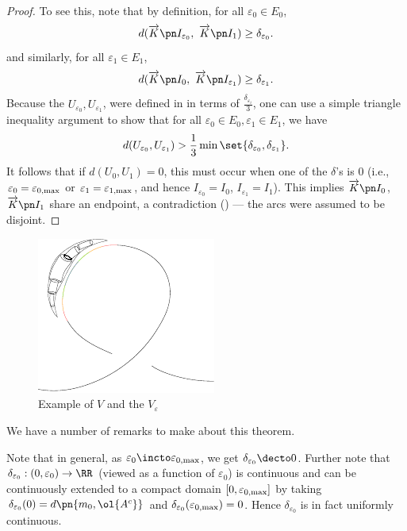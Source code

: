 \begin{proof}
  To see this, note that by definition, for all $\varepsilon_0 \in
  E_0$,
  \[
    d(\fim{K}{I_{\varepsilon_0}},\ \fim{K}{I_1}) \geq
    \delta_{\varepsilon_0}.
  \]
  and similarly, for all $\varepsilon_1 \in E_1$,
  \[
    d(\fim{K}{I_{0}},\ \fim{K}{I_{\varepsilon_1}}) \geq
    \delta_{\varepsilon_1}.
  \]
  Because the $U_{\varepsilon_0}, U_{\varepsilon_1}$, were defined in
  in terms of $\frac{\delta_{\varepsilon_i}}{3}$, one can use a simple
  triangle inequality argument to show that for all $\varepsilon_0 \in
  E_0, \varepsilon_1 \in E_1$, we have
  \[
    d(U_{\varepsilon_0}, U_{\varepsilon_1}) > \frac{1}{3}
    \min\set{\delta_{\varepsilon_0}, \delta_{\varepsilon_1}}.
  \]
  It follows that if $d(U_0, U_1) = 0$, this must occur when one of
  the $\delta$'s is $0$ (i.e., $\varepsilon_0 = \varepsilon_{0, {\rm
      max}}$ or $\varepsilon_1 = \varepsilon_{1, {\rm max}}$, and
  hence $I_{\varepsilon_0} = I_0$, $I_{\varepsilon_1} = I_1$). This
  implies $\fim{K}{I_0}$, $\fim{K}{I_1}$ share an endpoint, a
  contradiction (\jiong) --- the arcs were assumed to be disjoint.
  \qedhere
\end{proof}
\begin{figure}[H]
  \centering
  \includegraphics[scale=3]{figures/infinite-gauss-sequence/separation-cor-diagram-cropped.pdf}
  \caption{Example of $V$ and the $V_\varepsilon$}
  \label{fig:v-veps}
\end{figure}
We have a number of remarks to make about this theorem.
\begin{remark}
  Note that in general, as $\varepsilon_0 \incto \varepsilon_{0, \rm
    max}$, we get $\delta_{\varepsilon_0} \decto 0$. Further note that
  $\delta_{\varepsilon_0} : (0, \varepsilon_0) \to \RR$ (viewed as a
  function of $\varepsilon_0$) is continuous and can be continuously
  extended to a compact domain $[0, \varepsilon_{0, \rm max}]$ by
  taking $\delta_{\varepsilon_0}(0) = d\pn{m_0, \ol{A^c}}$ and
  $\delta_{\varepsilon_0}(\varepsilon_{0, \rm max}) = 0$. Hence
  $\delta_{\varepsilon_0}$ is in fact uniformly continuous.
\end{remark}
